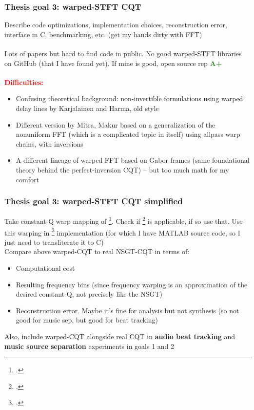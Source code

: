 \documentclass[usenames,dvipsnames]{beamer}
\begin{document}
\begin{frame}
	\frametitle{Thesis goal 3: warped-STFT CQT}
	Describe code optimizations, implementation choices, reconstruction error, interface in C, benchmarking, etc. (get my hands dirty with FFT)\\\ \\
	Lots of papers but hard to find code in public. No good warped-STFT libraries on GitHub (that I have found yet). If mine is good, open source rep \textcolor{ForestGreen}{\textbf{A+}}\\\ \\
	\textcolor{red}{\textbf{Difficulties:}}
	\begin{itemize}
		\item
			Confusing theoretical background: non-invertible formulations using warped delay lines by Karjalainen and Harma, old style
		\item
			Different version by Mitra, Makur based on a generalization of the nonuniform FFT (which is a complicated topic in itself) using allpass warp chains, with inversions
		\item
			A different lineage of warped FFT based on Gabor frames (same foundational theory behind the perfect-inversion CQT) -- but too much math for my comfort
	\end{itemize}
\end{frame}

\begin{frame}
	\frametitle{Thesis goal 3: warped-STFT CQT simplified}
	Take constant-Q warp mapping of \footcite{cqwarp}. Check if \footcite{betterwarp} is applicable, if so use that. Use this warping in \footcite{makur2008} implementation (for which I have MATLAB source code, so I just need to transliterate it to C)\\
	Compare above warped-CQT to real NSGT-CQT in terms of:
	\begin{itemize}
		\item
			Computational cost
		\item
			Resulting frequency bins (since frequency warping is an approximation of the desired constant-Q, not precisely like the NSGT)
		\item
			Reconstruction error. Maybe it's fine for analysis but not synthesis (so not good for music sep, but good for beat tracking)
	\end{itemize}

	Also, include warped-CQT alongside real CQT in \textbf{audio beat tracking} and \textbf{music source separation} experiments in goals 1 and 2
\end{frame}
\end{document}
